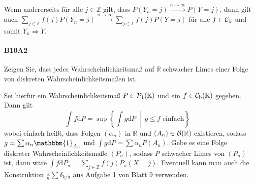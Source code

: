 \documentclass{article}
\begin{document}
Wenn andererseits für alle $j\in\mathbb{Z}$ gilt, dass $P(Y_n=j)\xrightarrow{n\to\infty}P(Y=j)$, dann gilt auch $\sum_{j\in\mathbb{Z}}f(j)P(Y_n=j)\xrightarrow{n\to\infty}\sum_{j\in\mathbb{Z}}f(j)P(Y=j)$ für alle $f\in{\cal C}_\mathrm{b}$ und somit $Y_n\Rightarrow Y$.
\newpage

\paragraph{B10A2}
Zeigen Sie, dass jedes Wahrscheinlichkeitsmaß auf $\mathbb{R}$ schwacher Limes einer Folge von diskreten Wahrscheinlichkeitsmaßen ist.

Sei hierfür ein Wahrscheinlichkeitsmaß $P\in{\cal P}_1(\mathbb{R})$ und ein $f\in{\cal C}_\mathrm{b}(\mathbb{R})$ gegeben.
Dann gilt
\[
\int f\mathrm{d}P=\sup\left\{\int g\mathrm{d}P~\middle\vert~ g\leq f\text{ einfach}\right\}\,
\]
wobei einfach heißt, dass Folgen $(\alpha_n)$ in $\mathbb{R}$ und $(A_n)\in{\cal B}(\mathbb{R})$ existieren, sodass $g=\sum\alpha_n \mathbbm{1}_{A_n}$ und $\int g\mathrm{d}P=\sum\alpha_n P(A_n)$.
Gebe es eine Folge diskreter Wahrscheinlichkeitsmaße $(P_n)$, sodass $P$ schwacher Limes von $(P_n)$ ist, dann wäre $\int f\mathrm{d}P_n=\sum_{j\in\mathbb{Z}}f(j)P_n(X=j)$.
Eventuell kann man auch die Konstruktion $\frac{1}{n}\sum\delta_{k/n}$ aus Aufgabe 1 von Blatt 9 verwenden.


\end{document}
